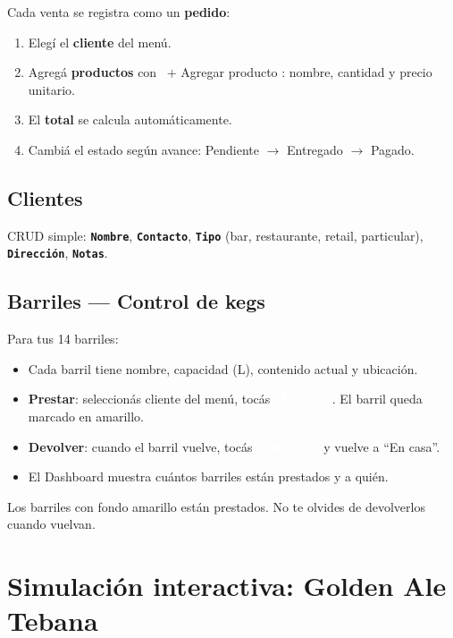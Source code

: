 \documentclass[11pt,a4paper]{report}
\newcommand{\appbtn}[1]{%
  \textcolor{white}{\colorbox{beer}{\footnotesize\sffamily\bfseries\ #1}}%
}
\newcommand{\appbtnsec}[1]{%
  \colorbox{black!10}{\footnotesize\sffamily\ #1}%
}
\newcommand{\appfield}[1]{\texttt{\footnotesize\color{beerdark}\textbf{#1}}}
\begin{document}
Cada venta se registra como un \textbf{pedido}:

\begin{enumerate}[leftmargin=*]
  \item Elegí el \textbf{cliente} del menú.
  \item Agregá \textbf{productos} con \appbtnsec{+ Agregar producto}: nombre, cantidad y precio unitario.
  \item El \textbf{total} se calcula automáticamente.
  \item Cambiá el estado según avance: Pendiente $\to$ Entregado $\to$ Pagado.
\end{enumerate}

\section{Clientes}

CRUD simple: \appfield{Nombre}, \appfield{Contacto}, \appfield{Tipo} (bar, restaurante, retail, particular), \appfield{Dirección}, \appfield{Notas}.

\section{Barriles — Control de kegs}

Para tus 14 barriles:

\begin{itemize}
  \item Cada barril tiene nombre, capacidad (L), contenido actual y ubicación.
  \item \textbf{Prestar}: seleccionás cliente del menú, tocás \appbtn{Prestar}. El barril queda marcado en amarillo.
  \item \textbf{Devolver}: cuando el barril vuelve, tocás \appbtn{Devolver} y vuelve a ``En casa''.
  \item El Dashboard muestra cuántos barriles están prestados y a quién.
\end{itemize}

\begin{tipbox}
Los barriles con fondo amarillo están prestados. No te olvides de devolverlos cuando vuelvan.
\end{tipbox}

\chapter{Simulación interactiva: Golden Ale Tebana}
\end{document}
